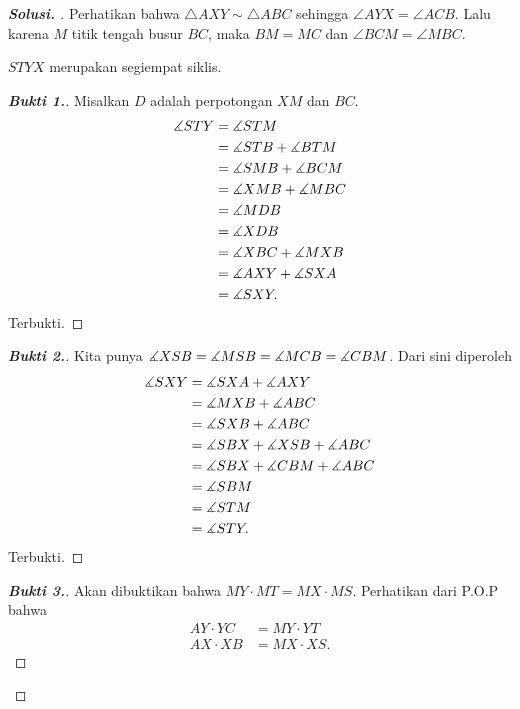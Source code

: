\documentclass[letterpaper, 13pt]{scrartcl}
\begin{document}
\begin{proof}[\textbf{Solusi. }]
    Perhatikan bahwa $\triangle AXY \sim \triangle ABC$ sehingga $\angle AYX = \angle ACB$. Lalu karena $M$ titik tengah busur $BC$, maka $BM=MC$ dan $\angle BCM = \angle MBC$.
    \begin{lemmarev}
        $STYX$ merupakan segiempat siklis.
    \end{lemmarev}
    \begin{proof}[\textbf{Bukti 1.}]
        Misalkan $D$ adalah perpotongan $XM$ dan $BC$.
       \begin{align*}
        \measuredangle STY &= \measuredangle STM\\
        &= \measuredangle STB + \measuredangle BTM\\
        &= \measuredangle SMB + \measuredangle BCM\\
        &= \measuredangle XMB + \measuredangle MBC\\
        &= \measuredangle MDB\\
        &= \measuredangle XDB\\
        &= \measuredangle XBC + \measuredangle MXB\\
        &= \measuredangle AXY + \measuredangle SXA\\
        &= \measuredangle SXY.
       \end{align*}
       Terbukti.
    \end{proof} 
    \begin{proof}[\textbf{Bukti 2.}]
        Kita punya $\measuredangle XSB = \measuredangle MSB = \measuredangle MCB = \measuredangle CBM$. Dari sini diperoleh
        \begin{align*}
            \measuredangle SXY &= \measuredangle SXA + \measuredangle AXY\\
            &= \measuredangle MXB + \measuredangle ABC\\
            &= \measuredangle SXB + \measuredangle ABC\\
            &= \measuredangle SBX + \measuredangle XSB + \measuredangle ABC\\
            &= \measuredangle SBX + \measuredangle CBM + \measuredangle ABC\\
            &= \measuredangle SBM\\
            &= \measuredangle STM\\
            &= \measuredangle STY.
        \end{align*}
        Terbukti.
    \end{proof}
    \begin{proof}[\textbf{Bukti 3.}]
        Akan dibuktikan bahwa $MY \cdot MT = MX \cdot MS$. Perhatikan dari P.O.P bahwa
        \begin{align*}
            AY \cdot YC &= MY \cdot YT\\
            AX \cdot XB &= MX \cdot XS.

\end{align*}
\end{proof}
\end{proof}
\end{document}
